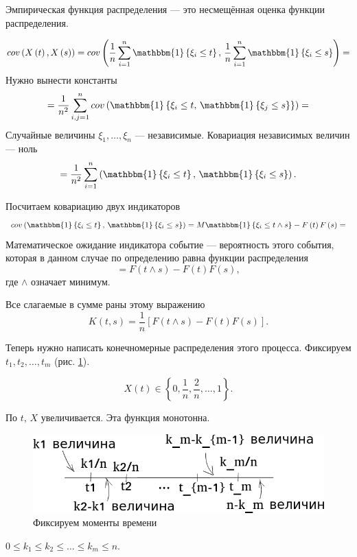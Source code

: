 Эмпирическая функция распределения --- это несмещённая оценка функции распределения.

$$cov \left( X \left( t \right), X \left( s \right) \right) =
  cov \left(
    \frac{1}{n} \sum \limits_{i = 1}^n \mathbbm{1} \left\{ \xi_i \leq t \right\}, \,
    \frac{1}{n} \sum \limits_{i = 1}^n \mathbbm{1} \left\{ \xi_i \leq s \right\} \right) =$$
Нужно вынести константы
$$= \frac{1}{n^2}
  \sum \limits_{i,j=1}^n
    cov \left(
      \mathbbm{1} \left\{ \xi_i \leq t, \, \mathbbm{1} \left\{ \xi_j \leq s \right\} \right\}
    \right) =$$
Случайные величины $ \xi_1, \dotsc, \xi_n$ --- независимые.
Ковариация независимых величин --- ноль
$$= \frac{1}{n^2}
  \sum \limits_{i = 1}^n
    \left(
      \mathbbm{1} \left\{ \xi_i \leq t \right\}, \, \mathbbm{1} \left\{ \xi_i \leq s \right\}
    \right).$$

Посчитаем ковариацию двух индикаторов
$$cov \left(
    \mathbbm{1} \left\{ \xi_i \leq t \right\}, \, \mathbbm{1} \left\{ \xi_i \leq s \right\}
  \right) =
  M \mathbbm{1} \left\{ \xi_i \leq t \wedge s \right\} - F \left( t \right) F \left( s \right) =$$
Математическое ожидание индикатора событие --- вероятность этого события,
которая в данном случае по определению равна функции распределения
$$= F \left( t \wedge s \right) - F \left( t \right) F \left( s \right),$$
где $ \wedge $ означает минимум.

Все слагаемые в сумме раны этому выражению
$$K \left( t, s \right) =
  \frac{1}{n} \left[ F \left( t \wedge s \right) - F \left( t \right) F \left( s \right) \right].$$

Теперь нужно написать конечномерные распределения этого процесса.
Фиксируем $t_1, t_2, \dotsc, t_m$ (рис. \ref{fig:261}).

$$X \left( t \right) \in
  \left\{ 0, \frac{1}{n}, \frac{2}{n}, \dotsc, 1 \right\}.$$

По $t, \, X$ увеличивается.
Эта функция монотонна.

\begin{figure}[h!]
 \centering
 \includegraphics[width=.5\textwidth]{./pictures/2_6_1.png}
 \caption{Фиксируем моменты времени}
 \label{fig:261}
\end{figure}

$0 \leq k_1 \leq k_2 \leq \dotsc \leq k_m \leq n$.

